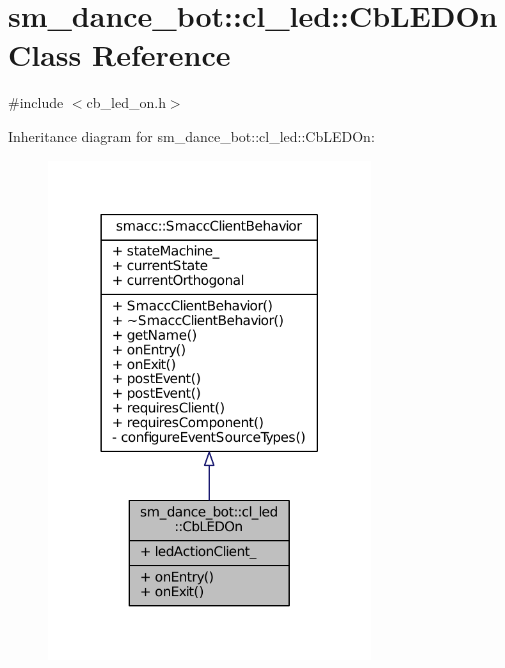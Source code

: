 \hypertarget{classsm__dance__bot_1_1cl__led_1_1CbLEDOn}{}\section{sm\+\_\+dance\+\_\+bot\+:\+:cl\+\_\+led\+:\+:Cb\+L\+E\+D\+On Class Reference}
\label{classsm__dance__bot_1_1cl__led_1_1CbLEDOn}


{\ttfamily \#include $<$cb\+\_\+led\+\_\+on.\+h$>$}



Inheritance diagram for sm\+\_\+dance\+\_\+bot\+:\+:cl\+\_\+led\+:\+:Cb\+L\+E\+D\+On\+:
\nopagebreak
\begin{figure}[H]
\begin{center}
\leavevmode
\includegraphics[width=242pt]{classsm__dance__bot_1_1cl__led_1_1CbLEDOn__inherit__graph}
\end{center}
\end{figure}


